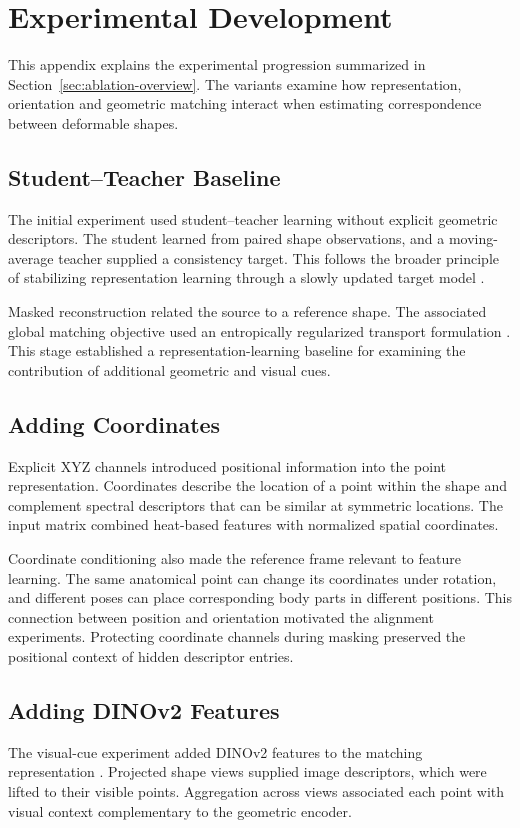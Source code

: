 \chapter{Experimental Development}
\label{app:development}

This appendix explains the experimental progression summarized in Section~\ref{sec:ablation-overview}. The variants examine how representation, orientation and geometric matching interact when estimating correspondence between deformable shapes.

\section{Student--Teacher Baseline}
\label{app:baseline}
The initial experiment used student--teacher learning without explicit geometric descriptors. The student learned from paired shape observations, and a moving-average teacher supplied a consistency target. This follows the broader principle of stabilizing representation learning through a slowly updated target model \citep{NIPS2017_68053af2}.

Masked reconstruction related the source to a reference shape. The associated global matching objective used an entropically regularized transport formulation \citep{Cuturi_2013}. This stage established a representation-learning baseline for examining the contribution of additional geometric and visual cues.

\section{Adding Coordinates}
\label{app:coordinates}
Explicit XYZ channels introduced positional information into the point representation. Coordinates describe the location of a point within the shape and complement spectral descriptors that can be similar at symmetric locations. The input matrix combined heat-based features with normalized spatial coordinates.

Coordinate conditioning also made the reference frame relevant to feature learning. The same anatomical point can change its coordinates under rotation, and different poses can place corresponding body parts in different positions. This connection between position and orientation motivated the alignment experiments. Protecting coordinate channels during masking preserved the positional context of hidden descriptor entries.

\section{Adding DINOv2 Features}
\label{app:dino}
The visual-cue experiment added DINOv2 features to the matching representation \citep{oquab2024dinov2learningrobustvisual}. Projected shape views supplied image descriptors, which were lifted to their visible points. Aggregation across views associated each point with visual context complementary to the geometric encoder.


